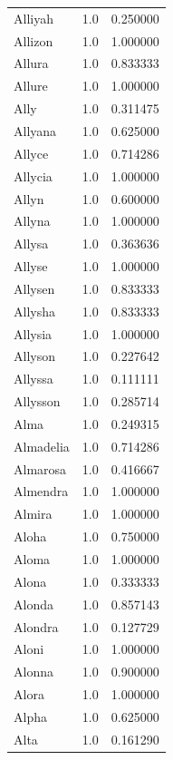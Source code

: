 \documentclass[
  letterpaper,
  DIV=11,
  numbers=noendperiod]{scrreprt}
\begin{document}
\begin{tabular}{lrr}
Alliyah         &   1.0 &   0.250000 \\
Allizon         &   1.0 &   1.000000 \\
Allura          &   1.0 &   0.833333 \\
Allure          &   1.0 &   1.000000 \\
Ally            &   1.0 &   0.311475 \\
Allyana         &   1.0 &   0.625000 \\
Allyce          &   1.0 &   0.714286 \\
Allycia         &   1.0 &   1.000000 \\
Allyn           &   1.0 &   0.600000 \\
Allyna          &   1.0 &   1.000000 \\
Allysa          &   1.0 &   0.363636 \\
Allyse          &   1.0 &   1.000000 \\
Allysen         &   1.0 &   0.833333 \\
Allysha         &   1.0 &   0.833333 \\
Allysia         &   1.0 &   1.000000 \\
Allyson         &   1.0 &   0.227642 \\
Allyssa         &   1.0 &   0.111111 \\
Allysson        &   1.0 &   0.285714 \\
Alma            &   1.0 &   0.249315 \\
Almadelia       &   1.0 &   0.714286 \\
Almarosa        &   1.0 &   0.416667 \\
Almendra        &   1.0 &   1.000000 \\
Almira          &   1.0 &   1.000000 \\
Aloha           &   1.0 &   0.750000 \\
Aloma           &   1.0 &   1.000000 \\
Alona           &   1.0 &   0.333333 \\
Alonda          &   1.0 &   0.857143 \\
Alondra         &   1.0 &   0.127729 \\
Aloni           &   1.0 &   1.000000 \\
Alonna          &   1.0 &   0.900000 \\
Alora           &   1.0 &   1.000000 \\
Alpha           &   1.0 &   0.625000 \\
Alta            &   1.0 &   0.161290 \\

\end{tabular}
\end{document}
